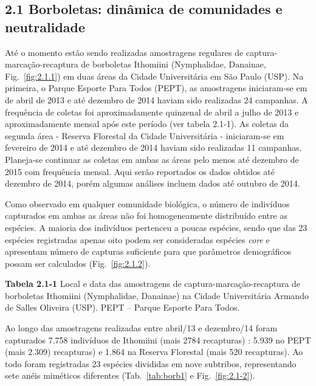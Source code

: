 \subsection{2.1 Borboletas: dinâmica de comunidades e neutralidade} %
\label{sec:dinamica-temporal-borb} 
Até o momento estão sendo realizadas amostragens regulares de
captura-marcação-recaptura de borboletas Ithomiini (Nymphalidae,
Danainae, Fig.~\ref{fig:2.1.1}) 
em duas áreas da Cidade Universitária em São Paulo (USP). Na
primeira, o Parque Esporte Para Todos (PEPT), as amostragens
iniciaram-se em de abril de 2013 e até dezembro de 2014 haviam sido
realizadas 24 campanhas. A frequência de coletas foi aproximadamente
quinzenal de abril a julho de 2013 e aproximadamente mensal após este
período (ver tabela 2.1-1). As coletas da segunda área - Reserva
Florestal da Cidade Universitária - iniciaram-se em fevereiro de 2014
e até dezembro de 2014 haviam sido realizadas 11 campanhas. Planeja-se
continuar as coletas em ambas as áreas pelo menos até dezembro de 2015
com frequência mensal. Aqui serão reportados os dados obtidos até
dezembro de 2014, porém algumas análises incluem dados até outubro de 2014.

Como observado em qualquer comunidade biológica, o número de
indivíduos capturados em ambas as áreas não foi homogeneamente
distribuído entre as espécies. A maioria dos indivíduos pertenceu a
poucas espécies, sendo que das 23 espécies registradas apenas oito
podem ser consideradas espécies \emph{core} e apresentam número de capturas
suficiente para que parâmetros demográficos possam ser calculados
(Fig.~\ref{fig:2.1.2}). 

\textbf{Tabela 2.1-1} Local e data das amostragens de
captura-marcação-recaptura de borboletas Ithomiini (Nymphalidae,
Danainae) na Cidade Universitária Armando de Salles Oliveira
(USP). PEPT – Parque Esporte Para Todos.

Ao longo das amostragens realizadas entre abril/13 e dezembro/14 foram
capturados 7.758 indivíduos de Ithomiini (mais 2784 recapturas) : 5.939 no PEPT (mais 2.309) recapturas) e 1.864 na Reserva Florestal (mais 520 recapturas). Ao todo foram registradas 23 espécies divididas em nove subtribos, representando sete anéis miméticos diferentes (Tab.~\ref{tab:borb1} e Fig.~\ref{fig:2.1-2}).

